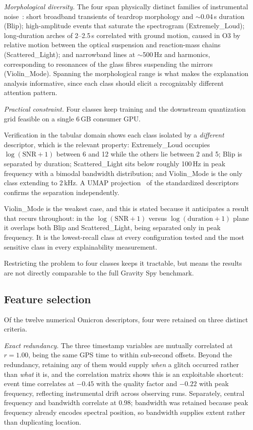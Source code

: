 \emph{Morphological diversity.} The four span physically distinct families of
instrumental noise~\cite{zevin2017, glanzer2023, bahaadini2018}: short broadband
transients of teardrop morphology and $\sim$0.04\,s duration (Blip);
high-amplitude events that saturate the spectrogram (Extremely\_Loud);
long-duration arches of 2--2.5\,s correlated with ground motion, caused in O3 by
relative motion between the optical suspension and reaction-mass chains
(Scattered\_Light); and narrowband lines at $\sim$500\,Hz and harmonics,
corresponding to resonances of the glass fibres suspending the mirrors
(Violin\_Mode). Spanning the morphological range is what makes the explanation
analysis informative, since each class should elicit a recognizably different
attention pattern.

\emph{Practical constraint.} Four classes keep training and the downstream
quantization grid feasible on a single 6\,GB consumer GPU.

Verification in the tabular domain shows each class isolated by a \emph{different}
descriptor, which is the relevant property: Extremely\_Loud occupies
$\log(\text{SNR}+1)$ between 6 and 12 while the others lie between 2 and 5; Blip
is separated by duration; Scattered\_Light sits below roughly 100\,Hz in peak
frequency with a bimodal bandwidth distribution; and Violin\_Mode is the only
class extending to 2\,kHz. A UMAP projection~\cite{mcinnes2018umap} of the
standardized descriptors confirms the separation independently.

Violin\_Mode is the weakest case, and this is stated because it anticipates a
result that recurs throughout: in the $\log(\text{SNR}+1)$ versus
$\log(\text{duration}+1)$ plane it overlaps both Blip and Scattered\_Light, being
separated only in peak frequency. It is the lowest-recall class at every
configuration tested and the most sensitive class in every explainability
measurement.

Restricting the problem to four classes keeps it tractable, but means the results
are not directly comparable to the full Gravity Spy benchmark.

\subsection{Feature selection}

Of the twelve numerical Omicron descriptors, four were retained on three distinct
criteria.

\emph{Exact redundancy.} The three timestamp variables are mutually correlated at
$r = 1.00$, being the same GPS time to within sub-second offsets. Beyond the
redundancy, retaining any of them would supply \emph{when} a glitch occurred
rather than \emph{what} it is, and the correlation matrix shows this is an
exploitable shortcut: event time correlates at $-0.45$ with the quality factor
and $-0.22$ with peak frequency, reflecting instrumental drift across observing
runs. Separately, central frequency and bandwidth correlate at $0.98$; bandwidth
was retained because peak frequency already encodes spectral position, so
bandwidth supplies extent rather than duplicating location.

